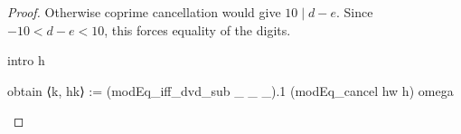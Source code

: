 \begin{proof}
  Otherwise coprime cancellation would give $10\mid d-e$.
  Since $-10<d-e<10$, this forces equality of the digits.

  \begin{lean}
    intro h

    obtain ⟨k, hk⟩ := (modEq_iff_dvd_sub _ _ _).1 (modEq_cancel hw h)
    omega
  \end{lean}
\end{proof}
